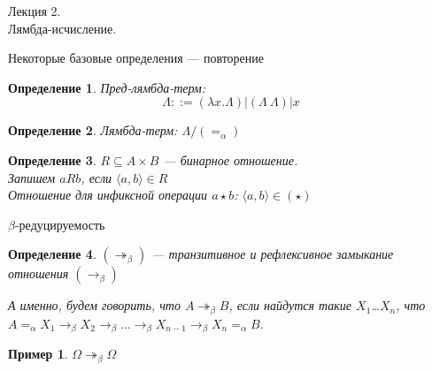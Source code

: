 \documentclass[aspectratio=169]{beamer}
\begin{document}
\newtheorem{dfn}{Определение}[section]
\newtheorem{nte}{Замечание}[section]

\newtheorem{axiom}{Аксиома}[section]
\newtheorem{thm}{Теорема}[section]
\newtheorem{lmm}[theorem]{Лемма}
\newtheorem{statement}{Утверждение}[section]
\newtheorem{oun_paragraph}{Пункт}[section]
\newtheorem{cons}{Следствие}[section]
\newtheorem*{exm}{Пример}

\newcommand{\comb}[1]{\operatorname{\bf{\textrm{#1}}}}
\newcommand{\func}[1]{\operatorname{#1}}
\newcommand{\reduction}[1]{{\color{OrangeRed}#1}}
\newcommand{\set}[1]{\left\{#1\right\}}

\def\from#1{\par \parbox{0.7\textwidth}{\par \hfill\raggedleft \it #1}} 

\begin{frame}{}
\begin{center}\Large Лекция 2.\\ \Large Лямбда-исчисление.\end{center}
\end{frame}

\begin{frame}{Некоторые базовые определения --- повторение}
\begin{dfn}Пред-лямбда-терм:
$$\Lambda ::= (\lambda x.\Lambda) | (\Lambda\ \Lambda) | x$$
\end{dfn}
\begin{dfn}Лямбда-терм: $\Lambda/(=_\alpha)$
\end{dfn}

\begin{dfn}$R \subseteq A \times B$ --- бинарное отношение.\\
Запишем $aRb$, если $\langle a, b \rangle \in R$\\
Отношение для инфиксной операции $a \star b$: $\langle a,b \rangle \in (\star)$
\end{dfn}
\end{frame}

\begin{frame}{$\beta$-редуцируемость}
\begin{dfn}
	$(\twoheadrightarrow_\beta)$ --- транзитивное и рефлексивное замыкание отношения $(\rightarrow_\beta)$

	А именно, будем говорить, что $A\twoheadrightarrow_{\beta}B$, если найдутся такие $X_{1}$\ldots $X_{n}$, что $A=_{\alpha}X_{1}\to_{\beta}X_{2}\to_{\beta}\ldots\to_{\beta}X_{n-1}\to_{\beta}X_{n}=_{\alpha}B$.
\end{dfn}

\begin{exm}
	$\Omega\twoheadrightarrow_{\beta}\Omega$
\end{exm}
\end{frame}
\end{document}

